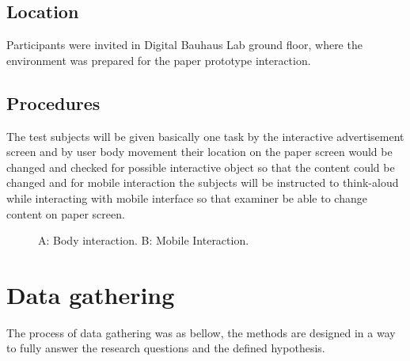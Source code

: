 \subsection{Location}
Participants were invited in Digital Bauhaus Lab ground floor, where the environment was prepared for the paper prototype interaction.


\subsection{Procedures}
The test subjects will be given basically one task by the interactive advertisement screen and by user body movement their location on the paper screen would be changed and checked for possible interactive object so that the content could be changed and for mobile interaction the subjects will be instructed to think-aloud while interacting with mobile interface so that examiner be able to change content on paper screen.

\begin{figure}[H]
    \centering
    \hfill
    \caption{A: Body interaction.  B: Mobile Interaction. }%
    \label{fig:Interactive_prototype}%
\end{figure}



\section{Data gathering}
The process of data gathering was as bellow, the methods are designed in a way to fully answer the research questions and the defined hypothesis.


